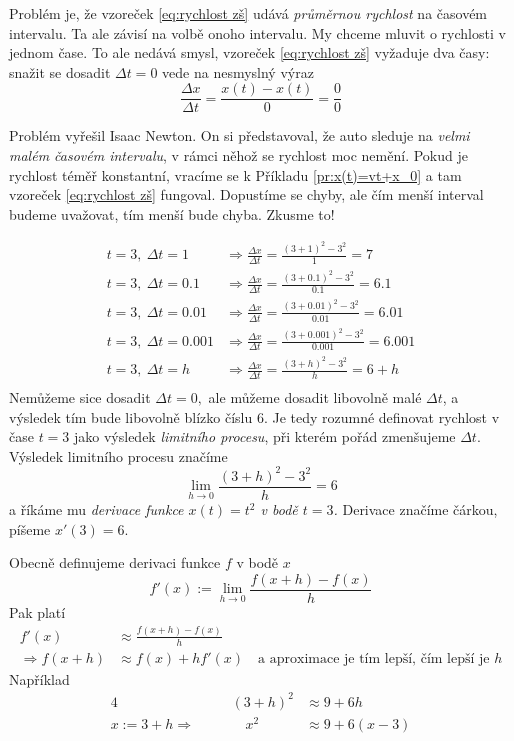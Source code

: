 Problém je, že vzoreček \ref{eq:rychlost zš} udává \emph{průměrnou rychlost} na časovém intervalu. Ta ale závisí na volbě onoho intervalu. My chceme mluvit o rychlosti v jednom čase. To ale nedává smysl, vzoreček \ref{eq:rychlost zš} vyžaduje dva časy: snažit se dosadit $\Delta t=0$ vede na nesmyslný výraz
\begin{equation}\label{eq: 0/0}
  \frac{\Delta x}{\Delta t} = \frac{x(t)-x(t)}{0}=\frac{0}{0}
\end{equation}

Problém vyřešil Isaac Newton. On si představoval, že auto sleduje na \emph{velmi malém časovém intervalu}, v rámci něhož se rychlost moc nemění. Pokud je rychlost téměř konstantní, vracíme se k Příkladu \ref{pr:x(t)=vt+x_0} a tam vzoreček \ref{eq:rychlost zš} fungoval. Dopustíme se chyby, ale čím menší interval budeme uvažovat, tím menší bude chyba. Zkusme to!

\begin{příklad}[Pokračování Příkladu \ref{pr:x(t)=t^2}]
  \begin{align*}
  	t=3,\ \Delta t=1 &\Rightarrow \frac{\Delta x}{\Delta t} = \frac{(3+1)^{2}-3^{2}}{1}=7 \\
  	t=3,\ \Delta t=0.1 &\Rightarrow \frac{\Delta x}{\Delta t} = \frac{(3+0.1)^{2}-3^{2}}{0.1}=6.1 \\
  	t=3,\ \Delta t=0.01 &\Rightarrow \frac{\Delta x}{\Delta t} = \frac{(3+0.01)^{2}-3^{2}}{0.01}=6.01 \\
  	t=3,\ \Delta t=0.001 &\Rightarrow \frac{\Delta x}{\Delta t} = \frac{(3+0.001)^{2}-3^{2}}{0.001}=6.001 \\
  	t=3,\ \Delta t=h &\Rightarrow \frac{\Delta x}{\Delta t} = \frac{(3+h)^{2}-3^{2}}{h}=6+h \\
  \end{align*}
  Nemůžeme sice dosadit $\Delta t=0,$ ale můžeme dosadit libovolně malé $\Delta t$, a výsledek tím bude libovolně blízko číslu 6. Je tedy rozumné definovat rychlost v čase $t=3$ jako výsledek \emph{limitního procesu}, při kterém pořád zmenšujeme $\Delta t.$ Výsledek limitního procesu značíme
  \begin{equation*}
	  \lim_{h\to 0}\frac{(3+h)^{2}-3^{2}}{h}=6
  \end{equation*}
  a říkáme mu \emph{derivace funkce $x(t)=t^{2}$ v bodě $t=3$.} Derivace značíme čárkou, píšeme $x'(3)=6.$
\end{příklad}

Obecně definujeme derivaci funkce $f$ v bodě $x$
\begin{equation*}
	f'(x):= \lim_{h\to 0}\frac{f(x+h)-f(x)}{h}
\end{equation*}
Pak platí
\begin{align*}
	f'(x) &\approx \frac{f(x+h)-f(x)}{h} \\
	\Rightarrow f(x+h)&\approx f(x)+hf'(x) \quad \text{a aproximace je tím lepší, čím lepší je }h
\end{align*}
Například
\begin{alignat*}{4}
	&&(3+h)^{2}&\approx 9+6h\quad \\
	x:=3+h \Rightarrow \quad&& \quad x^{2}&\approx 9+6(x-3)
\end{alignat*}

